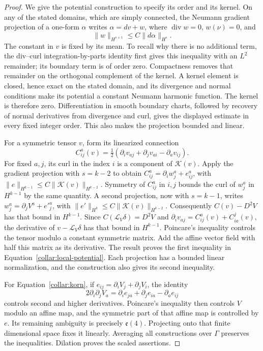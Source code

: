 \begin{proof}
We give the potential construction to specify its order and its
kernel.  On any of the stated domains, which are simply connected,
the Neumann gradient projection of a one-form \(\alpha\) writes
\(\alpha=dv+w\), where \(\operatorname{div}w=0\), \(w(\nu)=0\), and
\[
 \|w\|_{H^{s+1}}\le C\|d\alpha\|_{H^s}.
\]
The constant in \(v\) is fixed by its mean.  To recall why there is
no additional term, the div--curl integration-by-parts identity
first gives this inequality with an \(L^2\) remainder; its boundary
term is of order zero.  Compactness removes that remainder on the
orthogonal complement of the kernel.  A kernel element is closed,
hence exact on the stated domain, and its divergence and normal
conditions make its potential a constant Neumann harmonic
function.  The kernel is therefore zero.  Differentiation in smooth
boundary charts, followed by recovery of normal derivatives from
divergence and curl, gives the displayed estimate in every fixed
integer order.  This also makes the projection bounded and linear.

For a symmetric tensor \(v\), form its linearized connection
\[
 C^a_{ij}(v)=\tfrac12
       (\partial_i v_{aj}+\partial_j v_{ai}-\partial_a v_{ij}).
\]
For fixed \(a,j\), its curl in the index \(i\) is a component of
\(\mathcal K(v)\).  Apply the gradient projection with \(s=k-2\)
to obtain
\(C^a_{ij}=\partial_i w^a_j+e^a_{ij}\), with
\(\|e\|_{H^{k-1}}\le C\|\mathcal K(v)\|_{H^{k-2}}\).
Symmetry of \(C^a_{ij}\) in \(i,j\) bounds the curl of \(w^a_j\)
in \(H^{k-1}\) by the same quantity.  A second projection, now
with \(s=k-1\), writes \(w^a_j=\partial_j V^a+e'^a_j\), with
\(\|e'\|_{H^k}\le C\|\mathcal K(v)\|_{H^{k-2}}\).
Consequently \(C(v)-D^2V\) has that bound in \(H^{k-1}\).
Since \(C(\mathcal L_V\delta)=D^2V\) and
\(\partial_i v_{aj}=C^a_{ij}(v)+C^j_{ia}(v)\), the derivative
of \(v-\mathcal L_V\delta\) has that bound in \(H^{k-1}\).
Poincare's inequality controls the tensor modulo a constant symmetric
matrix.  Add the affine vector field with half this matrix as its
derivative.  The result proves the first inequality in
Equation~\eqref{collar:local-potential}.  Each projection has a
bounded linear normalization, and the construction also gives its
second inequality.

For Equation~\eqref{collar:korn}, if
\(e_{ij}=\partial_iV_j+\partial_jV_i\), the identity
\[
 2\partial_i\partial_jV_a
  =\partial_i e_{ja}+\partial_j e_{ia}-\partial_a e_{ij}
\]
controls second and higher derivatives.  Poincare's inequality
then controls \(V\) modulo an affine map, and the symmetric part
of that affine map is controlled by \(e\).  Its remaining ambiguity
is precisely \(\mathfrak e(4)\).  Projecting onto that finite
dimensional space fixes it linearly.  Averaging all constructions
over \(\Gamma\) preserves the inequalities.  Dilation proves the
scaled assertions.
\end{proof}

